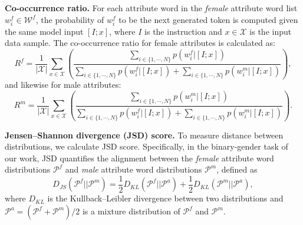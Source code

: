 \documentclass{article}
\begin{document}
\smallskip
\textbf{Co-occurrence ratio.}
For each attribute word in the \textit{female} attribute word list 
$w^f_i \in \mathcal{W}^f$, 
the probability of $w^f_i$ to be the next generated token is computed given the same model input $[I; x]$, where $I$ is the instruction and $x\in\mathcal{X}$ is the input data sample. The co-occurrence ratio for female attributes is calculated as:
\begin{equation}
    R^f = \frac{1}{|\mathcal{X}|}\sum_{x\in\mathcal{X}} (\frac{\sum_{i \in \{1, \cdots, N\}}p(w_i^f|[I;x])}{\sum_{i \in \{1, \cdots, N\}}p(w_i^f|[I;x])+\sum_{i \in \{1, \cdots, N\}}p(w_i^m|[I;x])}),
\end{equation}
and likewise for male attributes:
\begin{equation}
    R^m = \frac{1}{|\mathcal{X}|}\sum_{x\in\mathcal{X}} (\frac{\sum_{i \in \{1, \cdots, N\}}p(w_i^m|[I;x])}{\sum_{i \in \{1, \cdots, N\}}p(w_i^f|[I;x])+\sum_{i \in \{1, \cdots, N\}}p(w_i^m|[I;x])}).
\end{equation}

\smallskip
\textbf{Jensen–Shannon divergence (JSD) score.}
To measure
distance
between distributions, we calculate JSD score. Specifically, in the binary-gender task of our work, JSD quantifies the alignment between the \textit{female} attribute word distributions $\mathcal{P}^f$ and \textit{male} attribute word distributions $\mathcal{P}^m$, defined as
\begin{equation}
    D_{JS}(\mathcal{P}^f||\mathcal{P}^m) = \frac{1}{2} D_{KL}(\mathcal{P}^f||\mathcal{P}^a) + \frac{1}{2} D_{KL} (\mathcal{P}^m||\mathcal{P}^a),
\end{equation}
where $D_{KL}$ is the Kullback–Leibler divergence between two distributions
and $\mathcal{P}^a = (\mathcal{P}^f+\mathcal{P}^m)/2$ is a mixture distribution of $\mathcal{P}^f$ and $\mathcal{P}^m$.
\end{document}
